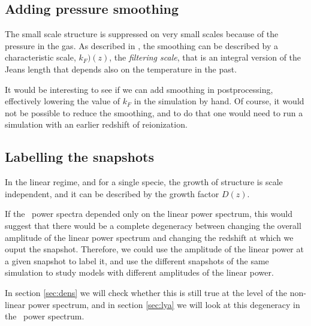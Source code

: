 \subsection{Adding pressure smoothing}

The small scale structure is suppressed on very small scales because of the
pressure in the gas. 
As described in \cite{Hui1997,Gnedin1998}, the smoothing can be described
by a characteristic scale, $k_F)(z)$, the \textit{filtering scale}, that is
an integral version of the Jeans length that depends also on the temperature
in the past.

It would be interesting to see if we can add smoothing in postprocessing, 
effectively lowering the value of $k_F$ in the simulation by hand. 
Of course, it would not be possible to reduce the smoothing, and to do that 
one would need to run a simulation with an earlier redshift of reionization.



\subsection{Labelling the snapshots}

In the linear regime, and for a single specie, the growth of structure is 
scale independent, and it can be described by the growth factor $D(z)$.

If the \lya\ power spectra depended only on the linear power spectrum, this 
would suggest that there would be a complete degeneracy between changing 
the overall amplitude of the linear power spectrum and changing the redshift
at which we ouput the snapshot. 
Therefore, we could use the amplitude of the linear power at a given snapshot
to label it, and use the different snapshots of the same simulation to study 
models with different amplitudes of the linear power. 

In section \ref{sec:dens} we will check whether this is still true at the 
level of the non-linear power spectrum, and in section \ref{sec:lya} we 
will look at this degeneracy in the \lya\ power spectrum. 

